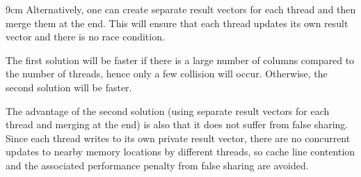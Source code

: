 \begin{parts}
\begin{solutionbox}{9cm}
        Alternatively, one can create separate result vectors for each thread and then merge them at the end.
        This will ensure that each thread updates its own result vector and there is no race condition.

        The first solution will be faster if there is a large number of columns compared to the number of threads, hence only a few collision will occur.
        Otherwise, the second solution will be faster.

        The advantage of the second solution (using separate result vectors for each thread and merging at the end) is also that it does not suffer from false sharing.
        Since each thread writes to its own private result vector, there are no concurrent updates to nearby memory locations by different threads, so cache line contention and the associated performance penalty from false sharing are avoided.
    \end{solutionbox}
\end{parts}
